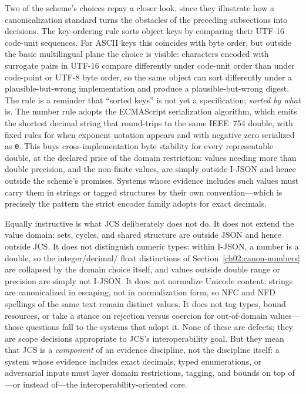 Two of the scheme's choices repay a closer look, since they
illustrate how a canonicalization standard turns the obstacles of
the preceding subsections into decisions. The key-ordering rule
sorts object keys by comparing their UTF-16 code-unit sequences.
For ASCII keys this coincides with byte order, but outside the
basic multilingual plane the choice is visible: characters encoded
with surrogate pairs in UTF-16 compare differently under
code-unit order than under code-point or UTF-8 byte order, so the
same object can sort differently under a plausible-but-wrong
implementation and produce a plausible-but-wrong digest. The rule
is a reminder that ``sorted keys'' is not yet a specification;
\emph{sorted by what} is. The number rule adopts the ECMAScript
serialization algorithm, which emits the shortest decimal string
that round-trips to the same IEEE~754 double, with fixed rules for
when exponent notation appears and with negative zero serialized
as \texttt{0}. This buys cross-implementation byte stability for
every representable double, at the declared price of the domain
restriction: values needing more than double precision, and the
non-finite values, are simply outside I-JSON and hence outside the
scheme's promises. Systems whose evidence includes such values must
carry them in strings or tagged structures by their own
convention---which is precisely the pattern the strict encoder
family adopts for exact decimals.

Equally instructive is what JCS deliberately does not do. It does not
extend the value domain: sets, cycles, and shared structure are
outside JSON and hence outside JCS. It does not distinguish numeric
types: within I-JSON, a number is a double, so the integer/decimal/
float distinctions of Section~\ref{ch02:canon-numbers} are collapsed
by the domain choice itself, and values outside double range or
precision are simply not I-JSON. It does not normalize Unicode
content: strings are canonicalized in escaping, not in normalization
form, so NFC and NFD spellings of the same text remain distinct
values. It does not tag types, bound resources, or take a stance on
rejection versus coercion for out-of-domain values---those questions
fall to the systems that adopt it. None of these are defects; they
are scope decisions appropriate to JCS's interoperability goal. But
they mean that JCS is a \emph{component} of an evidence discipline,
not the discipline itself: a system whose evidence includes exact
decimals, typed enumerations, or adversarial inputs must layer domain
restrictions, tagging, and bounds on top of---or instead of---the
interoperability-oriented core.


